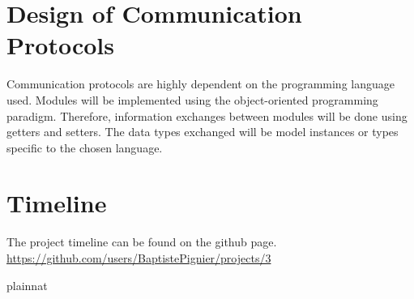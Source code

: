 \documentclass[12pt, titlepage]{article}
\begin{document}
\section{Design of Communication Protocols}

Communication protocols are highly dependent on the programming language used. Modules will be implemented using the object-oriented programming paradigm. 
Therefore, information exchanges between modules will be done using getters and setters. 
The data types exchanged will be model instances or types specific to the chosen language.

\section{Timeline}

The project timeline can be found on the github page. \url{https://github.com/users/BaptistePignier/projects/3}

 {plainnat}


\newpage{}
\end{document}
